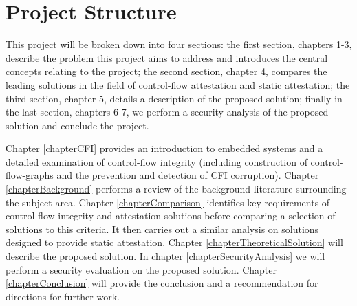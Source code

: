\section{Project Structure}

This project will be broken down into four sections: the first section, chapters 1-3, describe the problem this project aims to address and introduces the central concepts relating to the project; the second section, chapter 4, compares the leading solutions in the field of control-flow attestation and static attestation; the third section, chapter 5, details a description of the proposed solution; finally in the last section, chapters 6-7, we perform a security analysis of the proposed solution and conclude the project.

Chapter \ref{chapterCFI} provides an introduction to embedded systems and a detailed examination of control-flow integrity (including construction of control-flow-graphs and the prevention and detection of CFI corruption). Chapter \ref{chapterBackground} performs a review of the background literature surrounding the subject area. Chapter \ref{chapterComparison} identifies key requirements of control-flow integrity and attestation solutions before comparing a selection of solutions to this criteria. It then carries out a similar analysis on solutions designed to provide static attestation. Chapter \ref{chapterTheoreticalSolution} will describe the proposed solution. In chapter \ref{chapterSecurityAnalysis} we will perform a security evaluation on the proposed solution. Chapter \ref{chapterConclusion} will provide the conclusion and a recommendation for directions for further work.